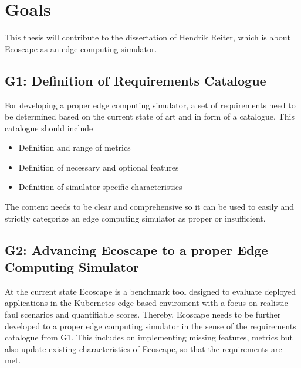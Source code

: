 \chapter{Goals}
This thesis will contribute to the dissertation of Hendrik Reiter, which is about Ecoscape as an edge computing simulator.

\section{G1: Definition of Requirements Catalogue}\label{goal-def-of-req-catalogue}
For developing a proper edge computing simulator, a set of requirements need to be determined based on the current state of art and in form of a catalogue.
This catalogue should include
\begin{itemize}
  \item Definition and range of metrics
  \item Definition of necessary and optional features
  \item Definition of simulator specific characteristics
\end{itemize}
The content needs to be clear and comprehensive so it can be used to easily and strictly categorize an edge computing simulator as proper or insufficient.

\section{G2: Advancing Ecoscape to a proper Edge Computing Simulator}
At the current state Ecoscape is a benchmark tool designed to evaluate deployed applications in the Kubernetes edge based enviroment with a focus on realistic faul scenarios and quantifiable scores.
Thereby, Ecoscape needs to be further developed to a proper edge computing simulator in the sense of the requirements catalogue from G1.
This includes on implementing missing features, metrics but also update existing characteristics of Ecoscape, so that the requirements are met.